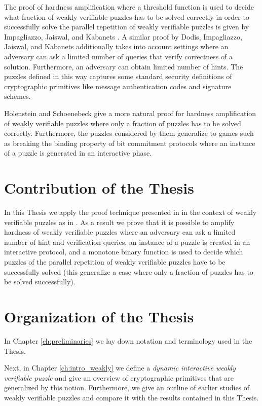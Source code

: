 \documentclass[11pt,a4paper,titlepage]{memoir}
\begin{document}
The proof of hardness amplification where a threshold function is used to decide what fraction of weakly verifiable puzzles has to be solved correctly
in order to successfully solve the parallel repetition of weakly verifiable puzzles is given by Impagliazzo, Jaiswal, and Kabanets \cite{impagliazzo2007chernoff}.
A similar proof by Dodis, Impagliazzo, Jaiswal, and Kabanets \cite{Dodis:2009:SAI:1530441.1530450} additionally
takes into account settings where an adversary can ask a limited number of queries that verify correctness of a solution.
Furthermore, an adversary can obtain limited number of hints. The puzzles defined in this way captures
some standard security definitions of cryptographic primitives like message authentication codes and signature schemes.

Holenstein and Schoenebeck \cite{DBLP:journals/corr/abs-1002-3534} give a more natural proof for hardness amplification
of weakly verifiable puzzles where only a fraction of puzzles has to be solved correctly.
Furthermore, the puzzles considered by them generalize to games such as breaking the binding property of bit commitment protocols
where an instance of a puzzle is generated in an interactive phase.

\section{Contribution of the Thesis}
In this Thesis we apply the proof technique presented in \cite{DBLP:journals/corr/abs-1002-3534}
in the context of weakly verifiable puzzles as in \cite{Dodis:2009:SAI:1530441.1530450}.
As a result we prove that it is possible to amplify hardness of weakly verifiable puzzles where an adversary
can ask a limited number of hint and verification queries, an instance of a puzzle is created in an interactive protocol,
and a monotone binary function is used to decide which puzzles of the parallel repetition of weakly verifiable puzzles
have to be successfully solved (this generalize a case where only a fraction of puzzles has to be solved successfully).

\section{Organization of the Thesis}
In Chapter \ref{ch:preliminaries} we lay down notation and terminology used in the Thesis.

Next, in Chapter \ref{ch:intro_weakly} we define a \textit{dynamic interactive weakly verifiable puzzle} and
give an overview of cryptographic primitives that are generalized by this notion.
Furthermore, we give an outline of earlier studies of weakly verifiable puzzles and compare
it with the results contained in this Thesis.
\end{document}
